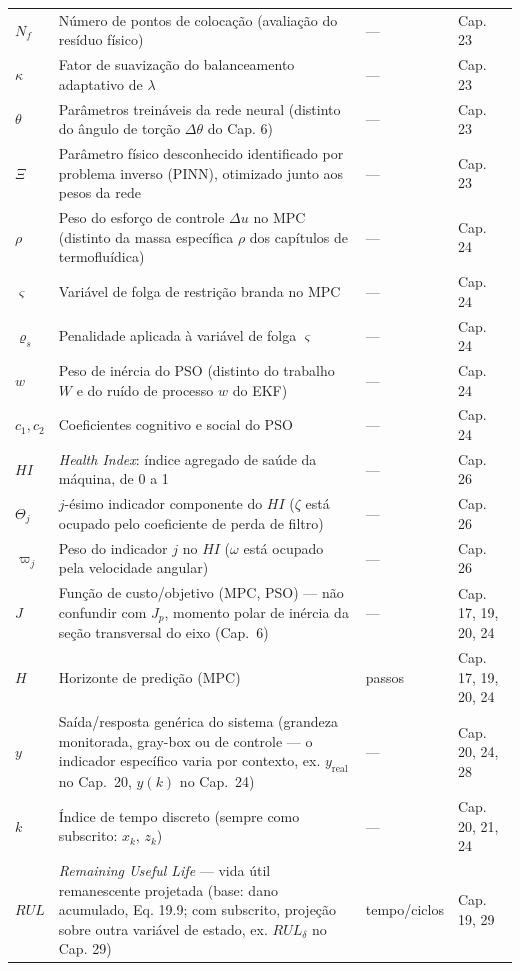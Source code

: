\documentclass[12pt,a4paper]{article}
\numberwithin{equation}{section}
\numberwithin{table}{section}
\numberwithin{figure}{section}
\begin{document}
{{\begin{longtable}{>{\raggedright\arraybackslash}p{2.8cm} >{\raggedright\arraybackslash}p{5.3cm} >{\raggedright\arraybackslash}p{2.1cm} >{\raggedright\arraybackslash}p{4.2cm}}
	$N_f$ & Número de pontos de colocação (avaliação do resíduo físico) & --- & Cap. 23 \\
	$\kappa$ & Fator de suavização do balanceamento adaptativo de $\lambda$ & --- & Cap. 23 \\
	$\theta$\dag & Parâmetros treináveis da rede neural (distinto do ângulo de torção $\Delta\theta$ do Cap. 6) & --- & Cap. 23 \\
	$\Xi$ & Parâmetro físico desconhecido identificado por problema inverso (PINN), otimizado junto aos pesos da rede & --- & Cap. 23 \\
	$\rho$\dag & Peso do esforço de controle $\Delta u$ no MPC (distinto da massa específica $\rho$ dos capítulos de termofluídica) & --- & Cap. 24 \\
	$\varsigma$ & Variável de folga de restrição branda no MPC & --- & Cap. 24 \\
	$\varrho_s$ & Penalidade aplicada à variável de folga $\varsigma$ & --- & Cap. 24 \\
	$w$\dag & Peso de inércia do PSO (distinto do trabalho $W$ e do ruído de processo $w$ do EKF) & --- & Cap. 24 \\
	$c_1, c_2$ & Coeficientes cognitivo e social do PSO & --- & Cap. 24 \\
	$HI$ & \textit{Health Index}: índice agregado de saúde da máquina, de 0 a 1 & --- & Cap. 26 \\
	$\Theta_j$\dag & $j$-ésimo indicador componente do $HI$ ($\zeta$ está ocupado pelo coeficiente de perda de filtro) & --- & Cap. 26 \\
	$\varpi_j$\dag & Peso do indicador $j$ no $HI$ ($\omega$ está ocupado pela velocidade angular) & --- & Cap. 26 \\
	$J$ & Função de custo/objetivo (MPC, PSO) — não confundir com $J_p$, momento polar de inércia da seção transversal do eixo (Cap.~6) & --- & Cap. 17, 19, 20, 24 \\
	$H$ & Horizonte de predição (MPC) & passos & Cap. 17, 19, 20, 24 \\
	$y$ & Saída/resposta genérica do sistema (grandeza monitorada, gray-box ou de controle — o indicador específico varia por contexto, ex. $y_{\text{real}}$ no Cap.~20, $y(k)$ no Cap.~24) & --- & Cap. 20, 24, 28 \\
	$k$ & Índice de tempo discreto (sempre como subscrito: $x_k$, $z_k$) & --- & Cap. 20, 21, 24 \\
	$RUL$ & \textit{Remaining Useful Life} — vida útil remanescente projetada (base: dano acumulado, Eq. 19.9; com subscrito, projeção sobre outra variável de estado, ex. $RUL_\delta$ no Cap. 29) & tempo/ciclos & Cap. 19, 29 \\

\end{longtable}}}
\end{document}
